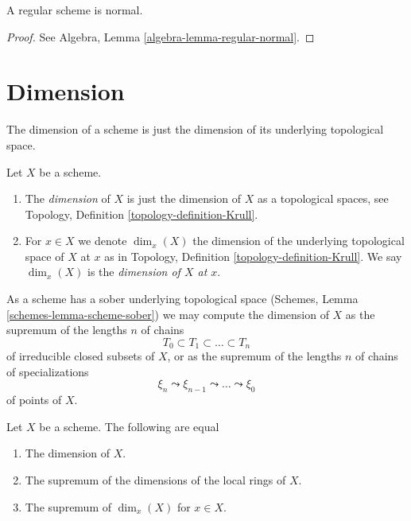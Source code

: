 \begin{lemma}
\label{lemma-regular-normal}
A regular scheme is normal.
\end{lemma}

\begin{proof}
See
Algebra, Lemma \ref{algebra-lemma-regular-normal}.
\end{proof}




\section{Dimension}
\label{section-dimension}

\noindent
The dimension of a scheme is just the dimension of its underlying
topological space.

\begin{definition}
\label{definition-dimension}
Let $X$ be a scheme.
\begin{enumerate}
\item The {\it dimension} of $X$ is just the dimension of $X$
as a topological spaces, see
Topology, Definition \ref{topology-definition-Krull}.
\item For $x \in X$ we denote $\dim_x(X)$ the dimension of the underlying
topological space of $X$ at $x$ as in
Topology, Definition \ref{topology-definition-Krull}.
We say $\dim_x(X)$ is the {\it dimension of $X$ at $x$}.
\end{enumerate}
\end{definition}

\noindent
As a scheme has a sober underlying topological space
(Schemes, Lemma \ref{schemes-lemma-scheme-sober})
we may compute the dimension of $X$ as the supremum of the lengths $n$
of chains
$$
T_0 \subset T_1 \subset \ldots \subset T_n
$$
of irreducible closed subsets of $X$, or as the supremum of the lengths $n$
of chains of specializations
$$
\xi_n \leadsto \xi_{n - 1} \leadsto \ldots \leadsto \xi_0
$$
of points of $X$.

\begin{lemma}
\label{lemma-dimension}
Let $X$ be a scheme. The following are equal
\begin{enumerate}
\item The dimension of $X$.
\item The supremum of the dimensions of the local rings of $X$.
\item The supremum of $\dim_x(X)$ for $x \in X$.
\end{enumerate}
\end{lemma}

